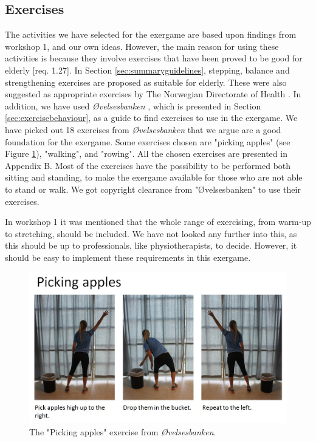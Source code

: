 \subsection{Exercises}
The activities we have selected for the exergame are based upon findings from workshop 1, and our own ideas. However, the main reason for using these activities is because they involve exercises that have been proved to be good for elderly [req. 1.27]. In Section \ref{sec:summaryguidelines}, stepping, balance and strengthening exercises are proposed as suitable for elderly. These were also suggested as appropriate exercises by The Norwegian Directorate of Health \cite{aktivitetsbok}. In addition, we have used \emph{Øvelsesbanken} \cite{eldretrening}, which is presented in Section \ref{sec:exercisebehaviour}, as a guide to find exercises to use in the exergame. We have picked out 18 exercises from \emph{Øvelsesbanken} that we argue are a good foundation for the exergame. Some exercises chosen are "picking apples" (see Figure \ref{pickingapples}), "walking", and "rowing". All the chosen exercises are presented in Appendix B. Most of the exercises have the possibility to be performed both sitting and standing, to make the exergame available for those who are not able to stand or walk. We got copyright clearance from "Øvelsesbanken" to use their exercises.  

In workshop 1 it was mentioned that the whole range of exercising, from warm-up to stretching, should be included. We have not looked any further into this, as this should be up to professionals, like physiotherapists, to decide. However, it should be easy to implement these requirements in this exergame.


\begin{figure} [H]
\centering
\includegraphics[scale=0.5]{PickingApplesAlone.jpg}
\caption[Exercise - picking apples]{The "Picking apples" exercise from \emph{Øvelsesbanken}.}
\label{pickingapples}
\end{figure}


